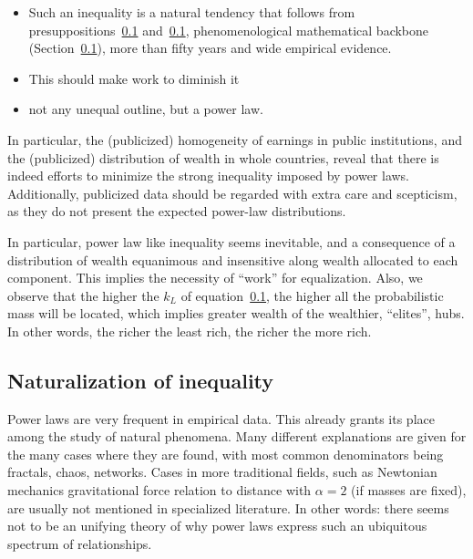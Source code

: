 \documentclass[a4paper, 11pt]{article} %
\begin{document}
\begin{itemize}
	\item Such an inequality is a natural tendency that follows from presuppositions~\ref{} and~\ref{}, phenomenological mathematical backbone (Section~\ref{}), more than fifty years and wide empirical evidence.

	\item This should make work to diminish it

	\item not any unequal outline, but a power law.
\end{itemize}

In particular, the (publicized)
homogeneity of earnings in public institutions,
and the (publicized) distribution of wealth in whole countries,
reveal that there is indeed efforts to minimize
the strong inequality imposed by power laws.
Additionally, publicized data should be regarded with
extra care and scepticism, as they do not present the
expected power-law distributions.

In particular, power law like inequality seems inevitable,
and a consequence of a distribution of wealth equanimous and insensitive
along wealth allocated to each component.
This implies the necessity of ``work'' for equalization.
Also, we observe that the higher the $k_L$ of equation~\ref{}, the
higher all the probabilistic mass will be located, which
implies greater wealth of the wealthier, ``elites'', hubs.
In other words, the richer the least rich,
the richer the more rich.

\subsection{Naturalization of inequality}

Power laws are very frequent in empirical data.
This already grants its place among the study of natural phenomena.
Many different explanations are given for the many cases where
they are found, with most common denominators being fractals, chaos,
networks. Cases in more traditional fields, such as Newtonian mechanics gravitational force relation to distance with $\alpha=2$ (if masses are fixed), are usually not mentioned in specialized literature. In other words: there seems not to be an unifying theory of why power laws express such
an ubiquitous spectrum of relationships.
\end{document}
